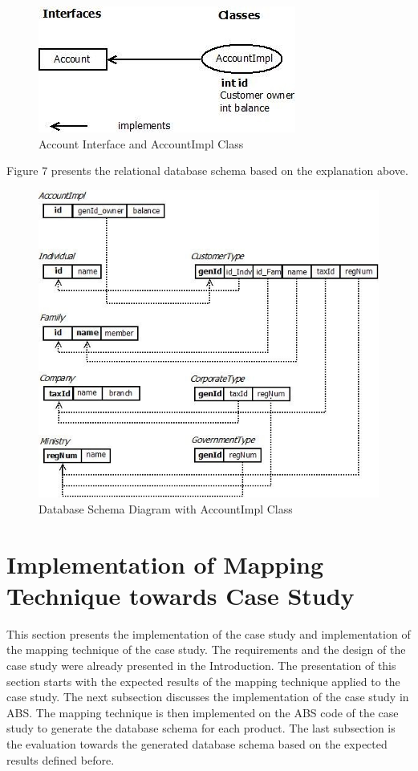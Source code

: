 \documentclass[runningheads,a4paper]{llncs}
\begin{document}
\begin{figure}
	\centering
	\includegraphics[scale=0.6]{sample2.jpg}
	\caption{Account Interface and AccountImpl Class}
	\label{sample}
\end{figure}

Figure 7 presents the relational database schema based on the explanation above.

\begin{figure}
	\centering
	\includegraphics[scale=0.7]{db2.jpg}
	\caption{Database Schema Diagram with AccountImpl Class}
	\label{sample}
\end{figure}


\section{Implementation of Mapping Technique towards Case Study}
This section presents the implementation of the case study and implementation of the mapping technique of the case study. The requirements and the design of the case study were already presented in the Introduction. The presentation of this section starts with the expected results of the mapping technique applied to the case study. The next subsection discusses the implementation of the case study in ABS. The mapping technique is then implemented on the ABS code of the case study to generate the database schema for each product. The last subsection is the evaluation towards the generated database schema based on the expected results defined before.
\end{document}
